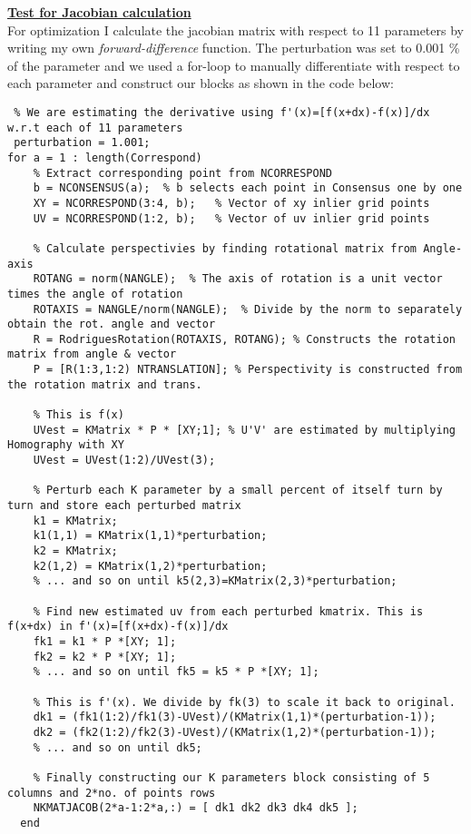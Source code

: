 \documentclass[titlepage]{article}
\begin{document}
\textbf{\underline{Test for Jacobian calculation}} \\
For optimization I calculate the jacobian matrix with respect to 11 parameters by writing my own \textit{forward-difference} function. The perturbation was set to 0.001 \% of the parameter and we used a for-loop to manually differentiate with respect to each parameter and construct our blocks as shown in the code below:
%
\begin{lstlisting}
 % We are estimating the derivative using f'(x)=[f(x+dx)-f(x)]/dx w.r.t each of 11 parameters
 perturbation = 1.001;
for a = 1 : length(Correspond)
    % Extract corresponding point from NCORRESPOND
    b = NCONSENSUS(a);  % b selects each point in Consensus one by one
    XY = NCORRESPOND(3:4, b);   % Vector of xy inlier grid points
    UV = NCORRESPOND(1:2, b);   % Vector of uv inlier grid points
    
    % Calculate perspectivies by finding rotational matrix from Angle-axis
    ROTANG = norm(NANGLE);  % The axis of rotation is a unit vector times the angle of rotation
    ROTAXIS = NANGLE/norm(NANGLE);  % Divide by the norm to separately obtain the rot. angle and vector
    R = RodriguesRotation(ROTAXIS, ROTANG); % Constructs the rotation matrix from angle & vector
    P = [R(1:3,1:2) NTRANSLATION]; % Perspectivity is constructed from the rotation matrix and trans.
    
    % This is f(x)
    UVest = KMatrix * P * [XY;1]; % U'V' are estimated by multiplying Homography with XY
    UVest = UVest(1:2)/UVest(3);
    
    % Perturb each K parameter by a small percent of itself turn by turn and store each perturbed matrix
    k1 = KMatrix;
    k1(1,1) = KMatrix(1,1)*perturbation; 
    k2 = KMatrix;
    k2(1,2) = KMatrix(1,2)*perturbation;
    % ... and so on until k5(2,3)=KMatrix(2,3)*perturbation;
    
    % Find new estimated uv from each perturbed kmatrix. This is f(x+dx) in f'(x)=[f(x+dx)-f(x)]/dx
    fk1 = k1 * P *[XY; 1];
    fk2 = k2 * P *[XY; 1];
    % ... and so on until fk5 = k5 * P *[XY; 1];
    
    % This is f'(x). We divide by fk(3) to scale it back to original.
    dk1 = (fk1(1:2)/fk1(3)-UVest)/(KMatrix(1,1)*(perturbation-1));
    dk2 = (fk2(1:2)/fk2(3)-UVest)/(KMatrix(1,2)*(perturbation-1));
    % ... and so on until dk5;
    
    % Finally constructing our K parameters block consisting of 5 columns and 2*no. of points rows 
    NKMATJACOB(2*a-1:2*a,:) = [ dk1 dk2 dk3 dk4 dk5 ];
  end
\end{lstlisting}
\end{document}
